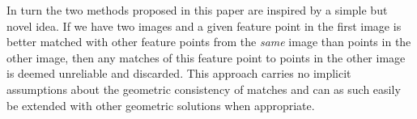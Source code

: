 \documentclass[12pt,journal]{IEEEtran}
\begin{document}
In turn the two methods proposed in this paper are inspired by a simple 
but novel idea. If we have two images and a given feature point in the 
first image is better matched with other feature points from the 
\emph{same} image than points in the other image, then any matches of 
this feature point to points in the other image is deemed unreliable and 
discarded.  This approach carries no implicit assumptions about the 
geometric consistency of matches and can as such easily be extended with 
other geometric solutions when appropriate.

\end{document}
